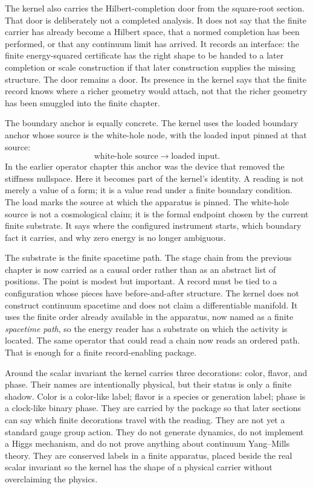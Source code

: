 The kernel also carries the Hilbert-completion door from the square-root section.
That door is deliberately not a completed analysis. It does not say that the
finite carrier has already become a Hilbert space, that a normed completion has
been performed, or that any continuum limit has arrived. It records an interface:
the finite energy-squared certificate has the right shape to be handed to a later
completion or scale construction if that later construction supplies the missing
structure. The door remains a door. Its presence in the kernel says that the
finite record knows where a richer geometry would attach, not that the richer
geometry has been smuggled into the finite chapter.

The boundary anchor is equally concrete. The kernel uses the loaded boundary anchor
whose source is the white-hole node, with the loaded input pinned at that source:
\[
  \text{white-hole source} \longrightarrow \text{loaded input}.
\]
In the earlier operator chapter this anchor was the device that removed the
stiffness nullspace. Here it becomes part of the kernel's identity. A reading is
not merely a value of a form; it is a value read under a finite boundary
condition. The load marks the source at which the apparatus is pinned. The
white-hole source is not a cosmological claim; it is the formal endpoint chosen
by the current finite substrate. It says where the configured instrument starts,
which boundary fact it carries, and why zero energy is no longer ambiguous.

The substrate is the finite spacetime path. The stage chain from the previous
chapter is now carried as a causal order rather than as an abstract list of
positions. The point is modest but important. A record must be tied to a
configuration whose pieces have before-and-after structure. The kernel does not
construct continuum spacetime and does not claim a differentiable manifold. It
uses the finite order already available in the apparatus, now named as
a finite \emph{spacetime path}, so the energy reader has a substrate on which the activity is
located. The same operator that could read a chain now reads an ordered path.
That is enough for a finite record-enabling package.

Around the scalar invariant the kernel carries three decorations: color, flavor,
and phase. Their names are intentionally physical, but their status is only a
finite shadow. Color is a color-like label; flavor is a species or generation
label; phase is a clock-like binary phase. They are carried by the package so
that later sections can say which finite decorations travel with the reading.
They are not yet a standard gauge group action. They do not generate dynamics,
do not implement a Higgs mechanism, and do not prove anything about continuum
Yang--Mills theory. They are conserved labels in a finite apparatus, placed
beside the real scalar invariant so the kernel has the shape of a physical
carrier without overclaiming the physics.

